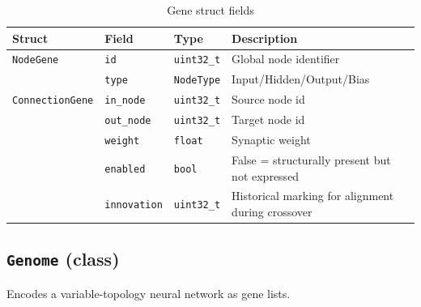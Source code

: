 \begin{table}[H]
\centering\small
\caption{Gene struct fields}
\begin{tabularx}{\textwidth}{@{}lllX@{}}
\toprule
\textbf{Struct} & \textbf{Field} & \textbf{Type} & \textbf{Description} \\
\midrule
\texttt{NodeGene}       & \texttt{id}         & \texttt{uint32\_t} & Global node identifier \\
                        & \texttt{type}       & \texttt{NodeType}  & Input/Hidden/Output/Bias \\
\midrule
\texttt{ConnectionGene} & \texttt{in\_node}   & \texttt{uint32\_t} & Source node id \\
                        & \texttt{out\_node}  & \texttt{uint32\_t} & Target node id \\
                        & \texttt{weight}     & \texttt{float}     & Synaptic weight \\
                        & \texttt{enabled}    & \texttt{bool}      & False = structurally present but not expressed \\
                        & \texttt{innovation} & \texttt{uint32\_t} & Historical marking for alignment during crossover \\
\bottomrule
\end{tabularx}
\end{table}

\subsection{\texttt{Genome} (class)}

Encodes a variable-topology neural network as gene lists.

